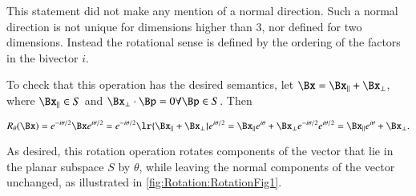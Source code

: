 This statement did not make any mention of a normal direction.
Such a normal direction is not unique for dimensions higher than 3, nor defined for two dimensions.
Instead the rotational sense is defined by the ordering of the factors in the bivector \( i \).

To check that this operation has the desired semantics,
let \( \Bx = \Bx_\parallel + \Bx_\perp \), where \( \Bx_\parallel \in S \) and \( \Bx_\perp \cdot \Bp = 0 \forall \Bp \in S \).  Then

\begin{dmath}\label{eqn:generalRotation:1880}
R_\theta(\Bx)
=
e^{ - i \theta/2 } \Bx e^{ i\theta/2 }
=
e^{ - i \theta/2 } \lr{ \Bx_\parallel + \Bx_\perp } e^{ i\theta/2 }
=
\Bx_\parallel e^{ i\theta } +
\Bx_\perp e^{ - i \theta/2 } e^{ i\theta/2 }
=
\Bx_\parallel e^{ i\theta } + \Bx_\perp.
\end{dmath}

As desired, this rotation operation 
rotates components of the vector that lie in the planar subspace \( S \) by \( \theta \), while leaving the normal components of the vector unchanged, as illustrated in \cref{fig:Rotation:RotationFig1}.

